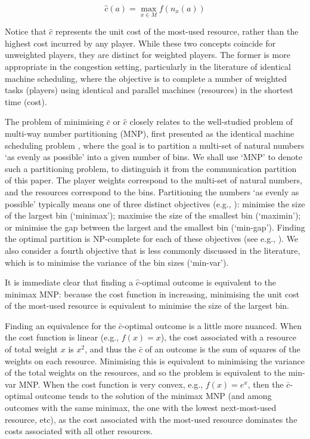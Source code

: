 \[ \hat c(a) = \max_{x \in M} f(n_x(a)) \]

Notice that $\hat c$ represents the unit cost of the most-used resource, rather than the highest cost incurred by any player. While these two concepts coincide for unweighted players, they are distinct for weighted players. The former is more appropriate in the congestion setting, particularly in the literature of identical machine scheduling, where the objective is to complete a number of weighted tasks (players) using identical and parallel machines (resources) in the shortest time (cost).

The problem of minimising $\bar c$ or $\hat c$ closely relates to the well-studied problem of multi-way number partitioning (MNP), first presented as the identical machine scheduling problem \cite{Graham69Identical_machine_scheduling}, where the goal is to partition a multi-set of natural numbers `as evenly as possible' into a given number of bins. We shall use `MNP' to denote such a partitioning problem, to distinguish it from the communication partition of this paper. The player weights correspond to the multi-set of natural numbers, and the resources correspond to the bins. Partitioning the numbers `as evenly as possible' typically means one of three distinct objectives (e.g., \cite{Korf2010MNP_Objectives}): minimise the size of the largest bin (`minimax'); maximise the size of the smallest bin (`maximin'); or minimise the gap between the largest and the smallest bin (`min-gap'). Finding the optimal partition is NP-complete for each of these objectives (see e.g., \cite{Garey1983NP-completeness}). We also consider a fourth objective that is less commonly discussed in the literature, which is to minimise the variance of the bin sizes (`min-var'). 

It is immediate clear that finding a $\hat c$-optimal outcome is equivalent to the minimax MNP: because the cost function in increasing, minimising the unit cost of the most-used resource is equivalent to minimise the size of the largest bin. 

Finding an equivalence for the $\bar c$-optimal outcome is a little more nuanced. When the cost function is linear (e.g., $f(x) = x$), the cost associated with a resource of total weight $x$ is $x^2$, and thus the $\bar c$ of an outcome is the sum of squares of the weights on each resource. Minimising this is equivalent to minimising the variance of the total weights on the resources, and so the problem is equivalent to the min-var MNP. When the cost function is very convex, e.g., $f(x) = e^x$, then the $\bar c$-optimal outcome tends to the solution of the minimax MNP (and among outcomes with the same minimax, the one with the lowest next-most-used resource, etc), as the cost associated with the most-used resource dominates the costs associated with all other resources.


